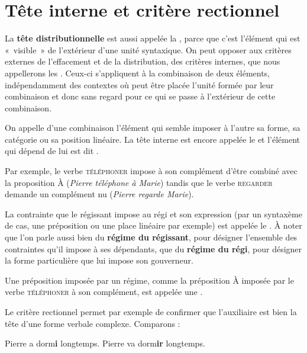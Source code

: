\section{Tête interne et critère rectionnel}\label{sec:3.3.16}

La \textbf{tête distributionnelle} est aussi appelée la , parce que c’est l’élément qui est «~visible~» de l’extérieur d’une unité syntaxique. On peut opposer aux critères externes de l’effacement et de la distribution, des critères internes, que nous appellerons les . Ceux-ci s’appliquent à la combinaison de deux éléments, indépendamment des contextes où peut être placée l’unité formée par leur combinaison et donc sans regard pour ce qui se passe à l’extérieur de cette combinaison.

\begin{styleLivreImportant}
On appelle  d’une combinaison l’élément qui semble imposer à l’autre sa forme, sa catégorie ou sa position linéaire. La tête interne est encore appelée le  et l’élément qui dépend de lui est dit .
\end{styleLivreImportant}

Par exemple, le verbe \textsc{téléphoner} impose à son complément d’être combiné avec la proposition À (\textit{Pierre téléphone à Marie}) tandis que le verbe \textsc{regarder} demande un complément nu (\textit{Pierre regarde Marie}).

\begin{styleLivreImportant}
La contrainte que le régissant impose au régi et son expression (par un syntaxème de cas, une préposition ou une place linéaire par exemple) est appelée le . À noter que l’on parle aussi bien du \textbf{régime du régissant}, pour désigner l’ensemble des contraintes qu’il impose à ses dépendants, que du \textbf{régime du régi}, pour désigner la forme particulière que lui impose son gouverneur.
\end{styleLivreImportant}

Une préposition imposée par un régime, comme la préposition À imposée par le verbe \textsc{téléphoner} à son complément, est appelée une .

Le critère rectionnel permet par exemple de confirmer que l’auxiliaire est bien la tête d’une forme verbale complexe. Comparons :

\ea
{Pierre a dorm}\textbf{{i}}  {longtemps.}
\z
\ea
{Pierre va dorm}\textbf{{ir}}  {longtemps.}
\z

